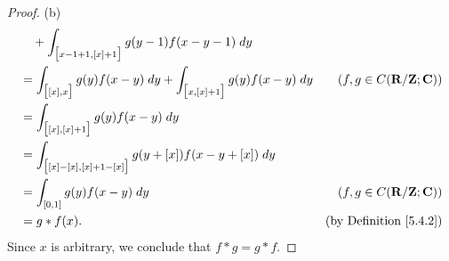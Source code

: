 \begin{proof}{(b)}
\begin{align*}
         & \quad + \int_{\big[x - 1 + 1, [x] + 1\big]} g(y - 1) f(x - y - 1) \; dy                                                                              \\
         & = \int_{\big[[x], x\big]} g(y) f(x - y) \; dy + \int_{\big[x, [x] + 1\big]} g(y) f(x - y) \; dy & (f, g \in C(\mathbf{R} / \mathbf{Z} ; \mathbf{C})) \\
         & = \int_{\big[[x], [x] + 1\big]} g(y) f(x - y) \; dy                                                                                                  \\
         & = \int_{\big[[x] - [x], [x] + 1 - [x]\big]} g(y + [x]) f(x - y + [x]) \; dy                                                                          \\
         & = \int_{[0, 1]} g(y) f(x - y) \; dy                                                             & (f, g \in C(\mathbf{R} / \mathbf{Z} ; \mathbf{C})) \\
         & = g * f(x).                                                                                     & \text{(by Definition \ref{5.4.2})}
    \end{align*}
    Since \(x\) is arbitrary, we conclude that \(f * g = g * f\).
\end{proof}

